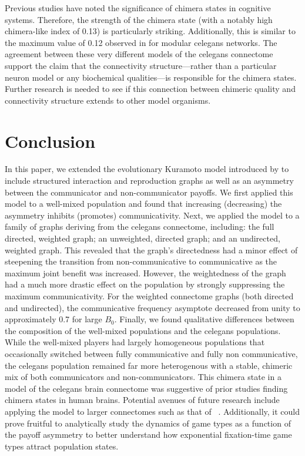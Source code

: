 \documentclass[pdflatex,lineno,referee,sn-mathphys-ay]{sn-jnl}
\begin{document}
Previous studies \citep[\eg][]{bansal2019cognitive,santos2017chimera}
have noted the significance of chimera states in cognitive systems.
Therefore, the strength of the chimera state
(with a notably high chimera-like index of \num{0.13}) is particularly striking.
Additionally, this is similar to the maximum value of \num{0.12}
observed in \citet{hizanidis2016chimera}
for modular \gls{celegans} networks.
The agreement between these very different models
of the \gls{celegans} connectome
support the claim that the connectivity structure---rather than
a particular neuron model or any biochemical qualities---is responsible
for the chimera states.
Further research is needed to see if this connection between chimeric quality
and connectivity structure extends to other model organisms.

\section{Conclusion}
In this paper, we extended the evolutionary Kuramoto model
introduced by \citet{tripp2022evolutionary}
to include structured interaction and reproduction graphs
as well as an asymmetry between
the communicator and non-communicator payoffs.
We first applied this model to a well-mixed population
and found that increasing (decreasing) the asymmetry
inhibits (promotes) communicativity.
Next, we applied the model to
a family of graphs deriving from the \gls{celegans} connectome,
including: the full directed, weighted graph;
an unweighted, directed graph;
and an undirected, weighted graph.
This revealed that the graph's directedness
had a minor effect of steepening the transition
from non-communicative to communicative
as the maximum joint benefit was increased.
However, the weightedness of the graph had a much more drastic effect
on the population by strongly suppressing the maximum communicativity.
For the weighted connectome graphs (both directed and undirected),
the communicative frequency asymptote decreased from unity
to approximately \num{0.7} for large $B_0$.
Finally, we found qualitative differences between the composition
of the well-mixed populations and the \gls{celegans} populations.
While the well-mixed players had largely homogeneous populations
that occasionally switched between fully communicative
and fully non communicative,
the \gls{celegans} population remained far more heterogenous
with a stable, chimeric mix of both communicators and non-communicators.
This chimera state in a model of the \gls{celegans} brain connectome
was suggestive of prior studies finding chimera states in human brains.
Potential avenues of future research include applying the model
to larger connectomes such as that
of ~\citep{schlegel2024whole}.
Additionally, it could prove fruitful to analytically study
the dynamics of game types as a function of the payoff asymmetry
to better understand how exponential fixation-time
game types attract population states.


\backmatter



\appendix

\end{document}
